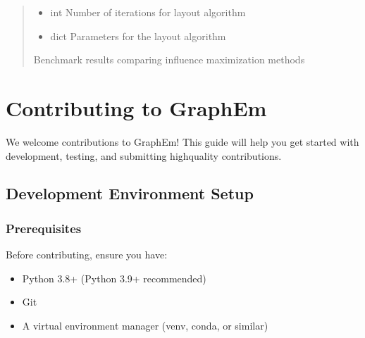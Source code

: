 \documentclass[letterpaper,10pt,english]{sphinxmanual}
\begin{document}
\begin{fulllineitems}
\begin{quote}
\begin{description}
\begin{itemize}
\item {} 
\sphinxAtStartPar
{} \textendash{} int
Number of iterations for layout algorithm

\item {} 
\sphinxAtStartPar
{} \textendash{} dict
Parameters for the layout algorithm

\end{itemize}

\sphinxAtStartPar
Benchmark results comparing influence maximization methods

\sphinxAtStartPar
{}

\end{description}\end{quote}

\end{fulllineitems}


\sphinxstepscope


\chapter{Contributing to GraphEm}
\label{\detokenize{contributing:contributing-to-graphem}}\label{\detokenize{contributing::doc}}
\sphinxAtStartPar
We welcome contributions to GraphEm! This guide will help you get started with development, testing, and submitting high\sphinxhyphen{}quality contributions.


\section{Development Environment Setup}
\label{\detokenize{contributing:development-environment-setup}}

\subsection{Prerequisites}
\label{\detokenize{contributing:prerequisites}}
\sphinxAtStartPar
Before contributing, ensure you have:
\begin{itemize}
\item {} 
\sphinxAtStartPar
Python 3.8+ (Python 3.9+ recommended)

\item {} 
\sphinxAtStartPar
Git

\item {} 
\sphinxAtStartPar
A virtual environment manager (venv, conda, or similar)

\end{itemize}
\end{document}
